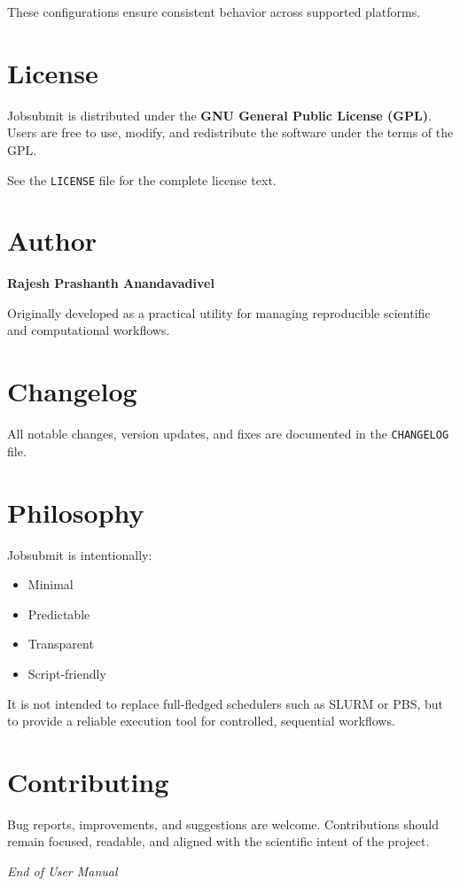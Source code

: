 \documentclass[12pt,a4paper]{article}
\begin{document}
These configurations ensure consistent behavior across supported platforms.

\section{License}

Jobsubmit is distributed under the \textbf{GNU General Public License (GPL)}.
Users are free to use, modify, and redistribute the software under the terms of the GPL.

See the \texttt{LICENSE} file for the complete license text.

\section{Author}

\textbf{Rajesh Prashanth Anandavadivel}

Originally developed as a practical utility for managing reproducible scientific and computational workflows.

\section{Changelog}

All notable changes, version updates, and fixes are documented in the \texttt{CHANGELOG} file.

\section{Philosophy}

Jobsubmit is intentionally:

\begin{itemize}
    \item Minimal
    \item Predictable
    \item Transparent
    \item Script-friendly
\end{itemize}

It is not intended to replace full-fledged schedulers such as SLURM or PBS, but to provide a reliable execution tool for controlled, sequential workflows.

\section{Contributing}

Bug reports, improvements, and suggestions are welcome.
Contributions should remain focused, readable, and aligned with the scientific intent of the project.

\vfill
\begin{center}
\textit{End of User Manual}
\end{center}
\end{document}
